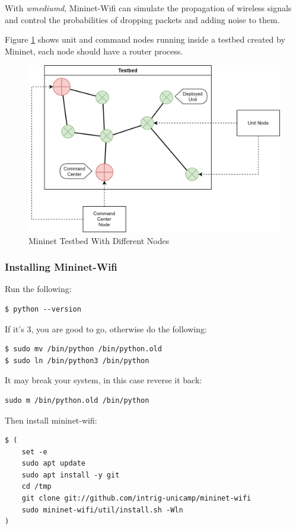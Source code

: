 With \textit{wmediumd}, Mininet-Wifi can simulate the propagation of wireless signals and control the probabilities of dropping packets and adding noise to them. 

Figure \ref{fig:mininet-diagram} shows unit and command nodes running inside a testbed created by Mininet, each node should have a router process.

\begin{figure}
    \centering
    \includegraphics[width=13cm]{images/nodes_diagram.png}
    \caption{Mininet Testbed With Different Nodes}
    \label{fig:mininet-diagram}
\end{figure}

\subsubsection{Installing Mininet-Wifi}
Run the following:
\begin{verbatim}
$ python --version
\end{verbatim}

If it's 3, you are good to go, otherwise do the following:

\begin{verbatim}
$ sudo mv /bin/python /bin/python.old
$ sudo ln /bin/python3 /bin/python
\end{verbatim}

It may break your system, in this case reverse it back: 
\begin{verbatim}
sudo m /bin/python.old /bin/python
\end{verbatim}

Then install mininet-wifi:

\begin{verbatim}
$ (
    set -e
    sudo apt update
    sudo apt install -y git
    cd /tmp
    git clone git://github.com/intrig-unicamp/mininet-wifi
    sudo mininet-wifi/util/install.sh -Wln
)   
\end{verbatim}

